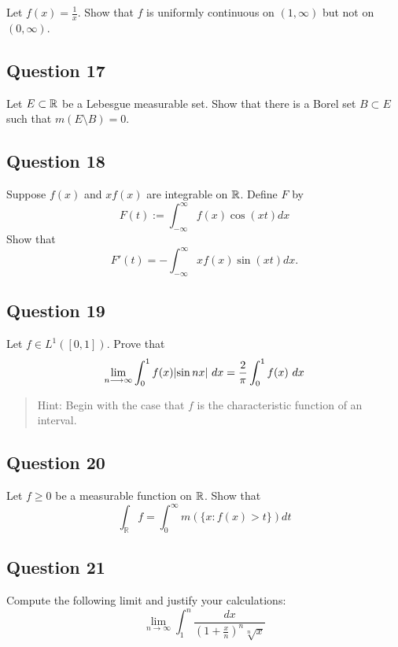 \documentclass[12pt]{article}
\begin{document}
Let \(f(x) = \frac 1 x\). Show that \(f\) is uniformly continuous on
\((1, \infty)\) but not on \((0,\infty)\).

\hypertarget{question-17-1}{%
\subsection{Question 17}\label{question-17-1}}

Let \(E\subset {\mathbb{R}}\) be a Lebesgue measurable set. Show that there is a
Borel set \(B \subset E\) such that \(m(E\setminus B) = 0\).

\hypertarget{question-18-1}{%
\subsection{Question 18}\label{question-18-1}}

Suppose \(f(x)\) and \(xf(x)\) are integrable on \({\mathbb{R}}\). Define \(F\)
by \[
F(t):=\int_{-\infty}^{\infty} f(x) \cos (x t) d x
\] Show that \[
F'(t)=-\int_{-\infty}^{\infty} x f(x) \sin (x t) d x.
\]

\hypertarget{question-19-1}{%
\subsection{Question 19}\label{question-19-1}}

Let \(f\in L^1([0, 1])\). Prove that \[
\lim_{n \longrightarrow \infty} \int_{0}^{1} f(x) {\left\lvert {\sin n x} \right\rvert} ~d x= \frac{2}{\pi} \int_{0}^{1} f(x) ~d x
\]

\begin{quote}
Hint: Begin with the case that \(f\) is the characteristic function of
an interval.
\end{quote}

\hypertarget{question-20-1}{%
\subsection{Question 20}\label{question-20-1}}

Let \(f \geq 0\) be a measurable function on \({\mathbb{R}}\). Show that \[
\int_{\mathbb{R}} f=\int_{0}^{\infty} m(\{x: f(x)>t\}) d t
\]

\hypertarget{question-21-1}{%
\subsection{Question 21}\label{question-21-1}}

Compute the following limit and justify your calculations: \[
\lim_{n \rightarrow \infty} \int_{1}^{n} \frac{d x}{\left(1+\frac{x}{n}\right)^{n} \sqrt[n]{x}}
\]
\end{document}
